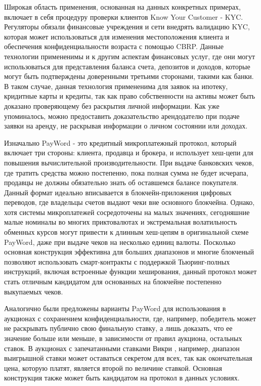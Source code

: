 Широкая область применения, основанная на данных конкретных примерах, включает в себя процедуру проверки клиентов Know Your Customer - KYC.
Регуляторы обязали финансовые учреждения и сети внедрять валидацию KYC, которая может использоваться для изменения местоположения клиента и обеспечения конфиденциальности возраста с помощью CBRP.
Данные технологии примененимы и к другим аспектам финансовых услуг, где они могут использоваться для представления баланса счета, депозитов и доходов, которые могут быть подтверждены доверенными третьими сторонами, такими как банки.
В таком случае, данная технология примененима для заявок на ипотеку, кридитные карты и кредиты, так как право собственности на активы может быть доказано проверяющему без раскрытия личной информации.
Как уже упоминалось, можно предоставить доказательство арендодателю при подаче заявки на аренду, не раскрывая информации о личном состоянии или доходах.

Изначально PayWord - это кредитный микроплатежный протокол, который включает три стороны: клиента, продавца и брокера, и использует хеш-цепи для повышения вычислительной производительности.
При выдаче банковских чеков, где тратить средства можно постепенно, пока полная сумма не будет исчерапа, продавцы не должны обязательно знать об оставшемся балансе покупателя.
Данный формат идеально вписывается в блокчейн-приложения цифровых переводов, где владельцы счетов выдают чеки вне основного блокчейна.
Однако, хотя системы микроплатежей сосредоточены на малых значениях, сегодняшние малые номиналы во многих приктовалютах и экстремальная волатильность обменных курсов могут привести к длинным хеш-цепям в оригинальной схеме PayWord, даже при выдаче чеков на несколько единиц валюты.
Посколько основная конструкция эффективна для больших диапазонов и многие блокченый позволяют использовать смарт-контракты с поддержкой Тьюринг-полных инструкций, включая встроенные функции хеширования, данный протокол может стать отличным кандидатом для основанных на блокчейне постепенно выкупаемых чеков.

Аналогично были предложены варианты PayWord для использования в аукционах с сохранением конфиденциальности, где, например, победитель может не раскрывать публично свою финальную ставку, а лишь доказать, что ее значение больше или меньше, в зависимости от правил аукциона, остальных ставок.
В аукционах с запечатанными ставками Викри \cite{https://doi.org/10.1111/j.1540-6261.1961.tb02789.x}, например, диапазон выигрышной ставки может оставаться секретом для всех, так как окончательная цена, которую платят, является второй по величине ставкой.
Основная конструкция также может быть кандидатом на протокол в данных условиях.

